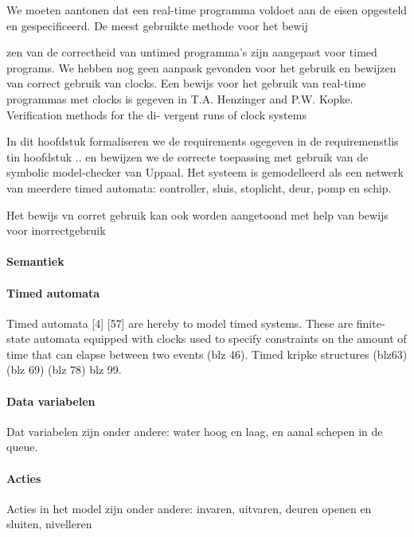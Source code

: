  We moeten aantonen dat een real-time programma voldoet aan de eisen opgesteld en gespecificeerd. De meest gebruikte methode voor het bewij
 
 zen van de correctheid van untimed programma's zijn aangepast voor timed programs.  We hebben nog geen aanpask gevonden voor het gebruik en bewijzen van correct gebruik van clocks.  Een bewijs voor het gebruik van real-time programmas met clocks is gegeven in T.A. Henzinger and P.W. Kopke. Verification methods for the di-
 vergent runs of clock systems
 
 In dit hoofdstuk formaliseren we de requirements ogegeven in de requiremenstlis tin hoofdstuk .. en bewijzen we de correcte toepassing met gebruik van de symbolic model-checker van Uppaal.
 Het systeem is gemodelleerd als een netwerk van meerdere timed automata: controller, sluis, stoplicht, deur, pomp en schip.
 
 Het bewijs vn corret gebruik kan ook worden aangetoond met help van bewijs voor inorrectgebruik
 
 
 
\paragraph{Semantiek}
 
 \paragraph{Timed automata}
  Timed automata [4] [57] are hereby to model timed systems. These are finite-state automata
 equipped with clocks used to specify constraints on the amount of time that can elapse
 between two events (blz 46). Timed kripke structures (blz63) (blz 69) (blz 78) blz 99.
 \cite{nourollahi20191215}
 
\paragraph{Data variabelen}
Dat variabelen zijn onder andere: water hoog  en laag, en aanal schepen in de queue.
\paragraph{Acties}
 Acties in het model zijn onder andere: invaren, uitvaren, deuren openen en sluiten, nivelleren
